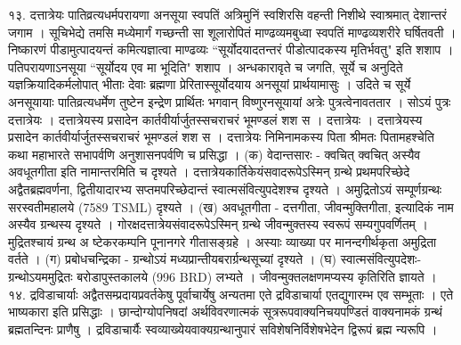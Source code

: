 १३. दत्तात्रेयः
पातिव्रत्यधर्मपरायणा अनसूया स्वपतिं अत्रिमुनिं स्वशिरसि वहन्ती निशीथे स्वाश्रमात् देशान्तरं जगाम । सूचिभेद्ये तमसि मध्येमार्गं गच्छन्ती सा शूलारोपितं माण्ढव्यमबुध्वा स्वपतिं माण्ढव्यशरीरे घर्षितवती । निष्कारणं पीडामुत्पादयन्तं कमित्यज्ञात्वा माण्ढव्यः ``सूर्योदयादतन्तरं पीडोत्पादकस्य मृतिर्भवतु" इति शशाप । पतिपरायणाऽनसूया ``सूर्योदय एव मा भूदिति" शशाप । अन्धकारावृते च जगति, सूर्ये च अनुदिते यज्ञक्रियादिकर्मलोपात् भीताः देवाः ब्रह्मणा प्रेरितास्सूर्योदयाय अनसूयां प्रार्थयामासुः । उदिते च सूर्ये अनसूयायाः पातिव्रत्यधर्मेण तुष्टेन इन्द्रेण प्रार्थितः भगवान् विष्णुरनसूयायां अत्रेः पुत्रत्वेनावततार । सोऽयं पुत्रः दत्तात्रेयः । दत्तात्रेयस्य प्रसादेन कार्तवीर्यार्जुतस्सचराचरं भूमण्डलं शश स । दत्तात्रेयः । दत्तात्रेयस्य प्रसादेन कार्तवीर्यार्जुतस्सचराचरं भूमण्डलं शश स । दत्तात्रेयः निमिनामकस्य पिता श्रीमतः पितामहश्चेति कथा महाभारते सभापर्वणि अनुशासनपर्वणि च प्रसिद्धा ।
(क) वेदान्तसारः -
क्वचित् क्वचित् अस्यैव अवधूतगीता इति नामान्तरमिति च दृश्यते । दत्तात्रेयकार्तिकेयंसवादरूपेऽस्मिन् ग्रन्थे प्रथमपरिच्छेदे अद्वैतब्रह्मवर्णना, द्वितीयादारभ्य सप्तमपरिच्छेदान्तं स्वात्मसंवित्युपदेशश्च दृश्यते । अमुद्रितोऽयं सम्पूर्णग्रन्थः सरस्वतीमहालये (7589 TSML) दृश्यते ।
(ख) अवधूतगीता -
दत्तगीता, जीवन्मुक्तिगीता, इत्यादिकं नाम अस्यैव ग्रन्थस्य दृश्यते । गोरक्षदत्तात्रेयसंवादरूपेऽस्मिन् ग्रन्थे जीवन्मुक्तस्य स्वरूपं सम्यगुपवर्णितम् । मुद्रितश्चायं ग्रन्थ अ ष्टेकरकम्पनि पूनानगरे गीतासङ्ग्रहे । अस्याः व्याख्या पर मानन्दगीर्थकृता अमुद्रिता वर्तते ।
(ग) प्रबोधचन्द्रिका -
ग्रन्थोऽयं मध्यप्रान्तीयबरार्ग्रन्थसूच्यां दृश्यते ।
(घ) स्वात्मसंवित्युपदेशः-
ग्रन्थोऽयममुद्रितः बरोडापुस्तकालये (996 BRD) लभ्यते । जीवन्मुक्तलक्षणमप्यस्य कृतिरिति ज्ञायते ।
१४. द्रविडाचार्याः
अद्वैतसम्प्रदायप्रवर्तकेषु पूर्वाचार्येषु अन्यतमा एते द्रविडाचार्या एतद्युगारम्भ एव सम्भूताः । एते भाष्यकारा इति प्रसिद्धाः । छान्दोग्योपनिषदां अर्थविवरणात्मकं सूत्ररूपवाक्यनिचयपण्डितं वाक्यनामकं ग्रन्थं ब्रह्मतन्दिनः प्राणैषु । द्रविडाचार्यैः स्वव्याख्येयवाक्यग्रन्थानुपारं सविशेषनिर्विशेषभेदेन द्विरूपं ब्रह्म न्यरूपि ।
